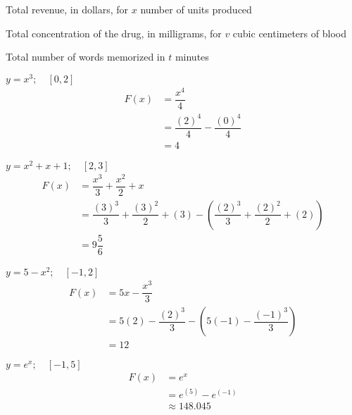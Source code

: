 \documentclass[12pt]{article}
\newenvironment{problem}[2][]{
    \begin{trivlist}
        \item[
            {\bfseries #1}
            {\bfseries #2.}
        ]
}{\end{trivlist}}
\begin{document}
\begin{problem}{19}
Total revenue, in dollars, for $x$ number of units produced
\end{problem}

\begin{problem}{21}
Total concentration of the drug, in milligrams, for $v$ cubic centimeters of blood
\end{problem}

\begin{problem}{23}
Total number of words memorized in $t$ minutes
\end{problem}

\begin{problem}{25}
$y = x^3; \quad [0, 2]$
\begin{align}
F(x) &= \dfrac{x^4}{4} \\
&= \dfrac{(2)^4}{4} - \dfrac{(0)^4}{4} \\
&= 4
\end{align}
\end{problem}

\begin{problem}{27}
$y = x^2 + x + 1; \quad [2, 3]$
\begin{align}
F(x) &= \dfrac{x^3}{3} + \dfrac{x^2}{2} + x \\
&= \dfrac{(3)^3}{3} + \dfrac{(3)^2}{2} + (3) - \left(\dfrac{(2  )^3}{3} + \dfrac{(2)^2}{2} + (2)\right) \\
&= 9 \dfrac{5}{6}
\end{align}
\end{problem}

\begin{problem}{29}
$y = 5 - x^2; \quad [-1, 2]$
\begin{align}
F(x) &= 5x - \dfrac{x^3}{3} \\
&= 5(2) - \dfrac{(2)^3}{3} - \left(5(-1) - \dfrac{(-1)^3}{3}\right) \\
&= 12
\end{align}
\end{problem}

\begin{problem}{31}
$y = e^x; \quad [-1, 5]$
\begin{align}
F(x) &= e^x \\
&= e^{(5)} - e^{(-1)} \\
&\approx 148.045
\end{align}
\end{problem}
\end{document}
